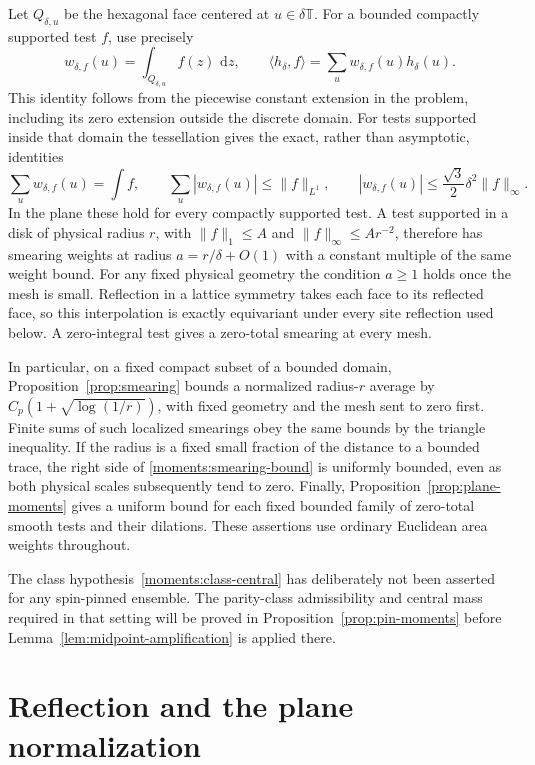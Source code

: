\documentclass[11pt]{article}
\newcommand{\T}{\mathbb T}
\newcommand{\dd}{\,\mathrm d}
\theoremstyle{definition}
\theoremstyle{remark}
\numberwithin{equation}{section}
\begin{document}
Let $Q_{\delta,u}$ be the hexagonal face centered at $u\in\delta\T$.
For a bounded compactly supported test $f$, use precisely
\begin{equation}\label{moments:area-weights}
 w_{\delta,f}(u)=\int_{Q_{\delta,u}}f(z)\,\dd z,
 \qquad
 \langle h_\delta,f\rangle
 =\sum_u w_{\delta,f}(u)h_\delta(u).
\end{equation}
This identity follows from the piecewise constant extension in the
problem, including its zero extension outside the discrete domain.
For tests supported inside that domain the tessellation gives the
exact, rather than asymptotic, identities
\[
 \sum_u w_{\delta,f}(u)=\int f,
 \qquad \sum_u|w_{\delta,f}(u)|\leq\|f\|_{L^1},
 \qquad |w_{\delta,f}(u)|\leq\frac{\sqrt3}{2}\delta^2\|f\|_\infty.
\]
In the plane these hold for every compactly supported test.  A test
supported in a disk of physical radius $r$, with
$\|f\|_1\leq A$ and $\|f\|_\infty\leq Ar^{-2}$, therefore has
smearing weights at radius $a=r/\delta+O(1)$ with a constant multiple
of the same weight bound.  For any fixed physical geometry the
condition $a\geq1$ holds once the mesh is small.  Reflection in a
lattice symmetry takes each face to its reflected face, so this
interpolation is exactly equivariant under every site reflection used
below.  A zero-integral test gives a zero-total smearing at every mesh.

In particular, on a fixed compact subset of a bounded domain,
Proposition~\ref{prop:smearing} bounds a normalized radius-$r$ average
by $C_p(1+\sqrt{\log(1/r)})$, with fixed geometry and the mesh sent
to zero first.  Finite sums of such localized smearings obey the same
bounds by the triangle inequality.  If the radius is a fixed small
fraction of the distance to a bounded trace, the right side of
\eqref{moments:smearing-bound} is uniformly bounded, even as both
physical scales subsequently tend to zero.  Finally,
Proposition~\ref{prop:plane-moments} gives a uniform bound for each
fixed bounded family of zero-total smooth tests and their dilations.
These assertions use ordinary Euclidean area weights throughout.

The class hypothesis~\eqref{moments:class-central} has deliberately
not been asserted for any spin-pinned ensemble.  The parity-class
admissibility and central mass required in that setting will be proved
in Proposition~\ref{prop:pin-moments} before
Lemma~\ref{lem:midpoint-amplification} is applied there.

\section{Reflection and the plane normalization}
\label{sec:plane}
\end{document}
